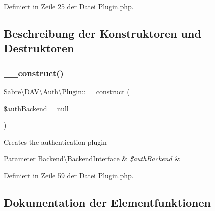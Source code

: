 Definiert in Zeile 25 der Datei Plugin.\+php.



\subsection{Beschreibung der Konstruktoren und Destruktoren}
\mbox{\label{class_sabre_1_1_d_a_v_1_1_auth_1_1_plugin_a1b5e2afac682f6b5a6e0c676ef6bb597}} 
\subsubsection{\texorpdfstring{\+\_\+\+\_\+construct()}{\_\_construct()}}
{\footnotesize\ttfamily Sabre\textbackslash{}\+D\+A\+V\textbackslash{}\+Auth\textbackslash{}\+Plugin\+::\+\_\+\+\_\+construct (\begin{DoxyParamCaption}\item[{\mbox{\hyperlink{interface_sabre_1_1_d_a_v_1_1_auth_1_1_backend_1_1_backend_interface}{Backend\textbackslash{}\+Backend\+Interface}}}]{\$auth\+Backend = {\ttfamily null} }\end{DoxyParamCaption})}

Creates the authentication plugin


\begin{DoxyParams}[1]{Parameter}
Backend\textbackslash{}\+Backend\+Interface & {\em \$auth\+Backend} & \\
\hline
\end{DoxyParams}


Definiert in Zeile 59 der Datei Plugin.\+php.



\subsection{Dokumentation der Elementfunktionen}
\mbox{\label{class_sabre_1_1_d_a_v_1_1_auth_1_1_plugin_a846ed4fb5b949a03bf3f98d8100e3059}} 
